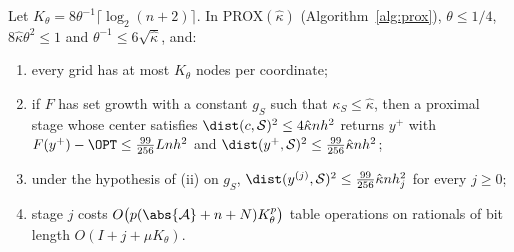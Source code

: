 \begin{lemma}\label{lem:proximal}
Let $K_\theta=8\theta^{-1}\lceil\log_2(n+2)\rceil$. In PROX$(\hat\kappa)$
(Algorithm~\ref{alg:prox}), $\theta\le1/4$, $8\hat\kappa\theta^2\le1$ and
$\theta^{-1}\le6\sqrt{\hat\kappa}$, and:
\begin{enumerate}[label=(\roman*)]
\item every grid has at most $K_\theta$ nodes per coordinate;
\item if $F$ has set growth with a constant $g_S$ such that
$\kappa_S\le\hat\kappa$, then a proximal stage whose center satisfies
$\dist(c,\mathcal S)^2\le4\hat\kappa nh^2$ returns $y^+$ with
$F(y^+)-\OPT\le\frac{99}{256}Lnh^2$ and
$\dist(y^+,\mathcal S)^2\le\frac{99}{256}\hat\kappa nh^2$;
\item under the hypothesis of (ii) on $g_S$,
$\dist(y^{(j)},\mathcal S)^2\le\frac{99}{256}\hat\kappa nh_j^2$ for every
$j\ge0$;
\item stage $j$ costs $O\bigl(p(\abs{\mathcal A}+n+N)K_\theta^p\bigr)$ table
operations on rationals of bit length $O(I+j+\mu K_\theta)$.
\end{enumerate}
\end{lemma}

